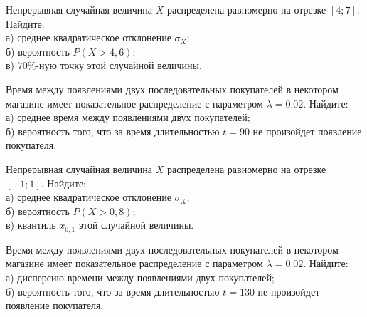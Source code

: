 \vfill

\newpage\setcounter{zad}{0}

\z Непрерывная случайная величина $X$ распределена равномерно на отрезке $[4; 7]$. Найдите: \\ \quad а) среднее квадратическое отклонение $\sigma_X$; \\ \quad б) вероятность $P(X>4{,}6)$; \\ \quad в) $70\%$-ную точку этой случайной величины.


\vfill

\z Время между появлениями двух последовательных покупателей в некотором магазине имеет показательное распределение с параметром $\lambda = 0.02$. Найдите: \\ \quad а) среднее время между появлениями двух покупателей; \\ \quad б) вероятность того, что за время длительностью $t = 90$ не произойдет появление покупателя.
 

\vfill

\newpage\setcounter{zad}{0}

\z Непрерывная случайная величина $X$ распределена равномерно на отрезке $[-1; 1]$. Найдите: \\ \quad а) среднее квадратическое отклонение $\sigma_X$; \\ \quad б) вероятность $P(X>0{,}8)$; \\ \quad в) квантиль $x_{0{,}1}$ этой случайной величины.


\vfill

\z Время между появлениями двух последовательных покупателей в некотором магазине имеет показательное распределение с параметром $\lambda = 0.02$. Найдите: \\ \quad а) дисперсию времени между появлениями двух покупателей; \\ \quad б) вероятность того, что за время длительностью $t = 130$ не произойдет появление покупателя.
 

\vfill

\newpage\setcounter{zad}{0}
